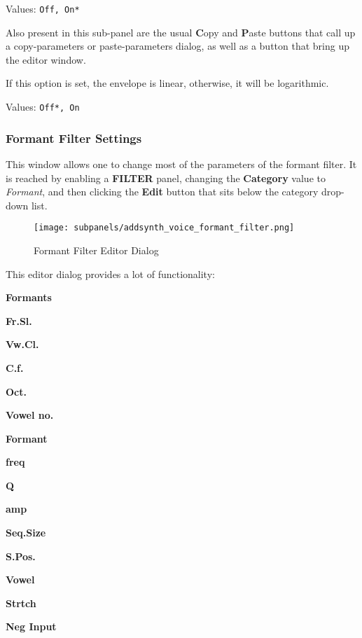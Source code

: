    Values: \texttt{Off, On*}

   Also present in this sub-panel are the usual \textbf{C}opy
   and \textbf{P}aste buttons that call up a copy-parameters or
   paste-parameters dialog, as well as a button that bring up the editor
   window.


   If this option is set, the envelope is linear, otherwise, it will be
   logarithmic.

   Values: \texttt{Off*, On}

\subsubsection{Formant Filter Settings}
\label{subsubsec:formant_filter_settings}

   This window allows one to change most of the parameters of the formant
   filter.   It is reached by enabling a \textbf{FILTER} panel,
   changing the \textbf{Category} value to \textsl{Formant}, and then clicking
   the \textbf{Edit} button that sits below the category drop-down list.

\begin{figure}[H]
   \centering 
   \texttt{[image: subpanels/addsynth\_voice\_formant\_filter.png]}
   \caption[Formant Filter Editor]{Formant Filter Editor Dialog}
   \label{fig:formant_filter_editor}
\end{figure}

   This editor dialog provides a lot of functionality:

   \begin{enumber}
      \item \textbf{Formants}
      \item \textbf{Fr.Sl.}
      \item \textbf{Vw.Cl.}
      \item \textbf{C.f.}
      \item \textbf{Oct.}
      \item \textbf{Vowel no.}
      \item \textbf{Formant}
      \item \textbf{freq}
      \item \textbf{Q}
      \item \textbf{amp}
      \item \textbf{Seq.Size}
      \item \textbf{S.Pos.}
      \item \textbf{Vowel}
      \item \textbf{Strtch}
      \item \textbf{Neg Input}
   \end{enumber}

